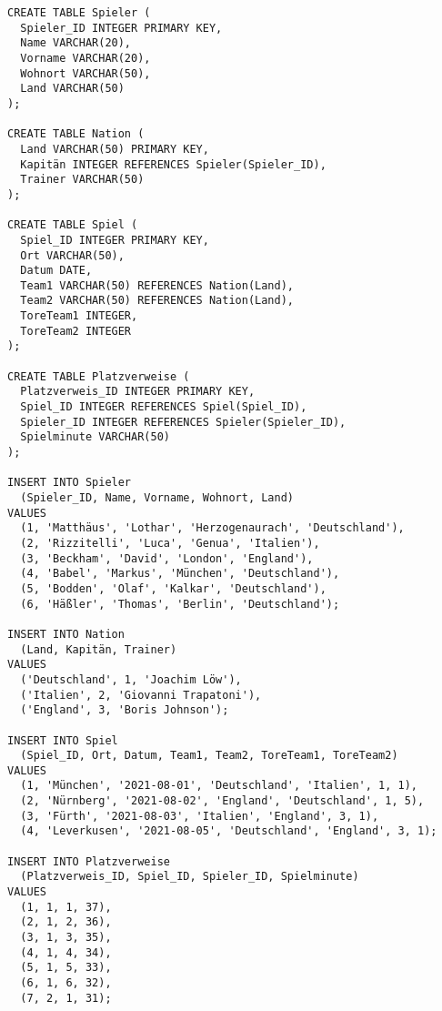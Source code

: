 \documentclass{bschlangaul-aufgabe}
\begin{document}
\begin{bAdditum}[Übungsdatenbank]
\begin{verbatim}
CREATE TABLE Spieler (
  Spieler_ID INTEGER PRIMARY KEY,
  Name VARCHAR(20),
  Vorname VARCHAR(20),
  Wohnort VARCHAR(50),
  Land VARCHAR(50)
);

CREATE TABLE Nation (
  Land VARCHAR(50) PRIMARY KEY,
  Kapitän INTEGER REFERENCES Spieler(Spieler_ID),
  Trainer VARCHAR(50)
);

CREATE TABLE Spiel (
  Spiel_ID INTEGER PRIMARY KEY,
  Ort VARCHAR(50),
  Datum DATE,
  Team1 VARCHAR(50) REFERENCES Nation(Land),
  Team2 VARCHAR(50) REFERENCES Nation(Land),
  ToreTeam1 INTEGER,
  ToreTeam2 INTEGER
);

CREATE TABLE Platzverweise (
  Platzverweis_ID INTEGER PRIMARY KEY,
  Spiel_ID INTEGER REFERENCES Spiel(Spiel_ID),
  Spieler_ID INTEGER REFERENCES Spieler(Spieler_ID),
  Spielminute VARCHAR(50)
);

INSERT INTO Spieler
  (Spieler_ID, Name, Vorname, Wohnort, Land)
VALUES
  (1, 'Matthäus', 'Lothar', 'Herzogenaurach', 'Deutschland'),
  (2, 'Rizzitelli', 'Luca', 'Genua', 'Italien'),
  (3, 'Beckham', 'David', 'London', 'England'),
  (4, 'Babel', 'Markus', 'München', 'Deutschland'),
  (5, 'Bodden', 'Olaf', 'Kalkar', 'Deutschland'),
  (6, 'Häßler', 'Thomas', 'Berlin', 'Deutschland');

INSERT INTO Nation
  (Land, Kapitän, Trainer)
VALUES
  ('Deutschland', 1, 'Joachim Löw'),
  ('Italien', 2, 'Giovanni Trapatoni'),
  ('England', 3, 'Boris Johnson');

INSERT INTO Spiel
  (Spiel_ID, Ort, Datum, Team1, Team2, ToreTeam1, ToreTeam2)
VALUES
  (1, 'München', '2021-08-01', 'Deutschland', 'Italien', 1, 1),
  (2, 'Nürnberg', '2021-08-02', 'England', 'Deutschland', 1, 5),
  (3, 'Fürth', '2021-08-03', 'Italien', 'England', 3, 1),
  (4, 'Leverkusen', '2021-08-05', 'Deutschland', 'England', 3, 1);

INSERT INTO Platzverweise
  (Platzverweis_ID, Spiel_ID, Spieler_ID, Spielminute)
VALUES
  (1, 1, 1, 37),
  (2, 1, 2, 36),
  (3, 1, 3, 35),
  (4, 1, 4, 34),
  (5, 1, 5, 33),
  (6, 1, 6, 32),
  (7, 2, 1, 31);
\end{verbatim}

\end{bAdditum}
\end{document}
